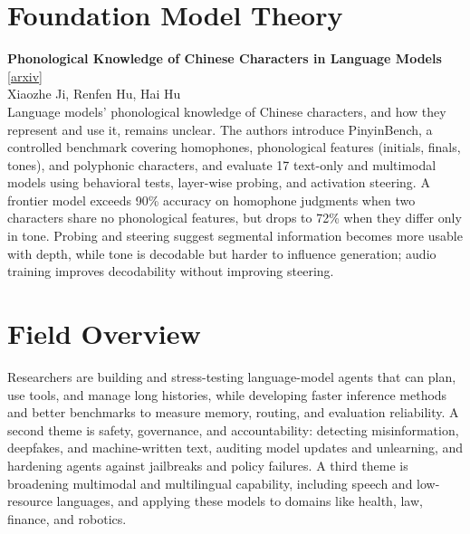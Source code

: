 \documentclass[12pt,letterpaper]{article}
\begin{document}
\medskip


\section*{Foundation Model Theory}

\begin{minipage}{\linewidth}
{\small\textbf{Phonological Knowledge of Chinese Characters in Language Models}} {\scriptsize[\href{https://arxiv.org/abs/2611.05803}{arxiv}]}\\
{\scriptsize Xiaozhe Ji, Renfen Hu, Hai Hu}\\


{\footnotesize Language models' phonological knowledge of Chinese characters, and how they represent and use it, remains unclear. The authors introduce PinyinBench, a controlled benchmark covering homophones, phonological features (initials, finals, tones), and polyphonic characters, and evaluate 17 text-only and multimodal models using behavioral tests, layer-wise probing, and activation steering. A frontier model exceeds 90\% accuracy on homophone judgments when two characters share no phonological features, but drops to 72\% when they differ only in tone. Probing and steering suggest segmental information becomes more usable with depth, while tone is decodable but harder to influence generation; audio training improves decodability without improving steering.}

\end{minipage}

\medskip



\section*{Field Overview}
{\footnotesize Researchers are building and stress-testing language-model agents that can plan, use tools, and manage long histories, while developing faster inference methods and better benchmarks to measure memory, routing, and evaluation reliability. A second theme is safety, governance, and accountability: detecting misinformation, deepfakes, and machine-written text, auditing model updates and unlearning, and hardening agents against jailbreaks and policy failures. A third theme is broadening multimodal and multilingual capability, including speech and low-resource languages, and applying these models to domains like health, law, finance, and robotics.}
\end{document}
